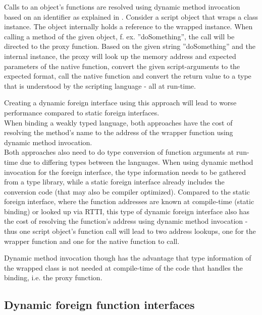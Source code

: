 Calls to an object's functions are resolved using dynamic method invocation based on an identifier as explained in . Consider a script object that wraps a class instance. The object internally holds a reference to the wrapped instance. When calling a method of the given object, f. ex. ''doSomething'', the call will be directed to the proxy function. Based on the given string ''doSomething'' and the internal instance, the proxy will look up the memory address and expected parameters of the native function, convert the given script-arguments to the expected format, call the native function and convert the return value to a type that is understood by the scripting language - all at run-time.

Creating a dynamic foreign interface using this approach will lead to worse performance compared to static foreign interfaces.\\
When binding a weakly typed language, both approaches have the cost of resolving the method's name to the address of the wrapper function using dynamic method invocation.\\
Both approaches also need to do type conversion of function arguments at run-time due to differing types between the languages. When using dynamic method invocation for the foreign interface, the type information needs to be gathered from a type library, while a static foreign interface already includes the conversion code (that may also be compiler optimized). Compared to the static foreign interface, where the function addresses are known at compile-time (static binding) or looked up via RTTI, this type of dynamic foreign interface also has the cost of resolving the function's address using dynamic method invocation - thus one script object's function call will lead to two address lookups, one for the wrapper function and one for the native function to call.

Dynamic method invocation though has the advantage that type information of the wrapped class is not needed at compile-time of the code that handles the binding, i.e. the proxy function.


\subsection{Dynamic foreign function interfaces}

